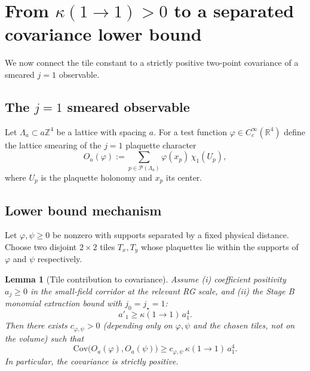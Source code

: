 \documentclass[11pt]{article}
\newtheorem{lemma}[theorem]{Lemma}
\theoremstyle{definition}
\newcommand{\1}{\mathbf{1}}
\begin{document}
\section{From $\kappa(1\to1)>0$ to a separated covariance lower bound}
We now connect the tile constant to a strictly positive two-point covariance of a smeared $j=1$ observable.

\subsection{The $j=1$ smeared observable}
Let $\Lambda_a\subset a\mathbb Z^4$ be a lattice with spacing $a$. For a test function $\varphi\in C_c^\infty(\mathbb R^4)$ define the lattice smearing of the $j=1$ plaquette character
\[
O_a(\varphi):=\sum_{p\in\mathcal P(\Lambda_a)} \varphi(x_p)\,\chi_1(U_p),
\]
where $U_p$ is the plaquette holonomy and $x_p$ its center.

\subsection{Lower bound mechanism}
Let $\varphi,\psi\ge 0$ be nonzero with supports separated by a fixed physical distance. Choose two disjoint $2\times2$ tiles $T_x,T_y$ whose plaquettes lie within the supports of $\varphi$ and $\psi$ respectively.

\begin{lemma}[Tile contribution to covariance]
Assume (i) coefficient positivity $a_j\ge0$ in the small-field corridor at the relevant RG scale, and (ii) the Stage B monomial extraction bound with $j_0=j_\star=1$:
\[
 a'_1\ge \kappa(1\to1)\,a_1^4.
\]
Then there exists $c_{\varphi,\psi}>0$ (depending only on $\varphi,\psi$ and the chosen tiles, not on the volume) such that
\[
\mathrm{Cov}\big(O_a(\varphi),O_a(\psi)\big)\ge c_{\varphi,\psi}\,\kappa(1\to1)\,a_1^4.
\]
In particular, the covariance is strictly positive.
\end{lemma}
\end{document}
